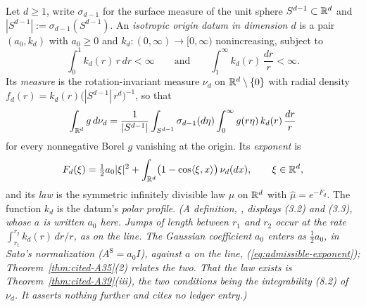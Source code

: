 \begin{definition}
\label{def:isotropic-origin-data}
\leanok
{}
Let $d \ge 1$, write $\sigma_{d-1}$ for the surface measure of the unit sphere
$S^{d-1} \subset \mathbb{R}^d$ and $|S^{d-1}| := \sigma_{d-1}(S^{d-1})$. An \emph{isotropic origin datum
in dimension $d$} is a pair $(a_0, k_d)$ with $a_0 \ge 0$ and $k_d : (0,\infty) \to [0,\infty)$
nonincreasing, subject to
\[
  \int_0^1 k_d(r)\,r\,dr < \infty \qquad\text{and}\qquad \int_1^\infty k_d(r)\,\frac{dr}{r} < \infty .
\]
Its \emph{\Levy{} measure} is the rotation-invariant measure $\nu_d$ on $\mathbb{R}^d \setminus \{0\}$
with radial density $f_d(r) = k_d(r)\bigl(|S^{d-1}|\,r^d\bigr)^{-1}$, so that
\[
  \int_{\mathbb{R}^d} g\,d\nu_d = \frac{1}{|S^{d-1}|}\int_{S^{d-1}}\sigma_{d-1}(d\eta)
  \int_0^\infty g(r\eta)\,k_d(r)\,\frac{dr}{r}
\]
for every nonnegative Borel $g$ vanishing at the origin. Its \emph{exponent} is
\[
  F_d(\xi) = \tfrac12 a_0|\xi|^2 + \int_{\mathbb{R}^d}\bigl(1 - \cos\langle\xi, x\rangle\bigr)\,\nu_d(dx),
  \qquad \xi \in \mathbb{R}^d,
\]
and its \emph{law} is the symmetric infinitely divisible law $\mu$ on $\mathbb{R}^d$ with
$\widehat\mu = e^{-F_d}$. The function $k_d$ is the datum's \emph{polar profile}.
\statusT\quad\emph{(A definition, , displays (3.2) and (3.3), whose
$a$ is written $a_0$ here. Jumps of length between $r_1$ and $r_2$ occur at the rate
$\int_{r_1}^{r_2}k_d(r)\,dr/r$, as on the line. The Gaussian coefficient $a_0$ enters as
$\tfrac12 a_0$, in Sato's normalization ($A^{\mathrm S} = a_0I$), against $a$ on the line,
(\ref{eq:admissible-exponent}); Theorem~\ref{thm:cited-A35}(2) relates the two. That the law exists is
Theorem~\ref{thm:cited-A39}(iii), the two conditions being the integrability (8.2) of $\nu_d$. It asserts
nothing further and cites no ledger entry.)}
\end{definition}


